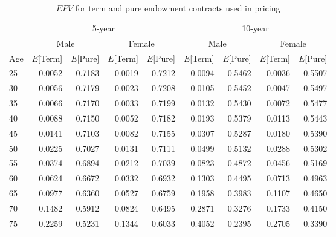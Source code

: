 \begin{table}[!htpb]
\centering
\begingroup\small
\begin{tabular}{|l|rrrr|rrrr|}
  \hline
& \multicolumn{4}{c|}{5-year} & \multicolumn{4}{c|}{10-year} \\
 & \multicolumn{2}{c}{Male} & \multicolumn{2}{c|}{Female} & \multicolumn{2}{c}{Male} & \multicolumn{2}{c|}{Female} \\
 \hline
Age & $E$[Term] & $E$[Pure] & $E$[Term] & $E$[Pure] & $E$[Term] & $E$[Pure] & $E$[Term] & $E$[Pure] \\ 
  \hline
25 & 0.0052 & 0.7183 & 0.0019 & 0.7212 & 0.0094 & 0.5462 & 0.0036 & 0.5507 \\ 
  30 & 0.0056 & 0.7179 & 0.0023 & 0.7208 & 0.0105 & 0.5452 & 0.0047 & 0.5497 \\ 
  35 & 0.0066 & 0.7170 & 0.0033 & 0.7199 & 0.0132 & 0.5430 & 0.0072 & 0.5477 \\ 
  40 & 0.0088 & 0.7150 & 0.0052 & 0.7182 & 0.0193 & 0.5379 & 0.0113 & 0.5443 \\ 
  45 & 0.0141 & 0.7103 & 0.0082 & 0.7155 & 0.0307 & 0.5287 & 0.0180 & 0.5390 \\ 
  50 & 0.0225 & 0.7027 & 0.0131 & 0.7111 & 0.0499 & 0.5132 & 0.0288 & 0.5302 \\ 
  55 & 0.0374 & 0.6894 & 0.0212 & 0.7039 & 0.0823 & 0.4872 & 0.0456 & 0.5169 \\ 
  60 & 0.0624 & 0.6672 & 0.0332 & 0.6932 & 0.1303 & 0.4495 & 0.0713 & 0.4963 \\ 
  65 & 0.0977 & 0.6360 & 0.0527 & 0.6759 & 0.1958 & 0.3983 & 0.1107 & 0.4650 \\ 
  70 & 0.1482 & 0.5912 & 0.0824 & 0.6495 & 0.2871 & 0.3276 & 0.1733 & 0.4150 \\ 
  75 & 0.2259 & 0.5231 & 0.1344 & 0.6033 & 0.4052 & 0.2395 & 0.2705 & 0.3390 \\ 
   \hline
\end{tabular}
\endgroup
\caption{$EPV$ for term and pure endowment contracts used in pricing} 
\end{table}

